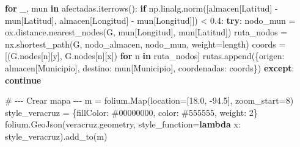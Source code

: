 \documentclass[
  spanish,
  us-letterpaper,
]{scrreprt}
\newenvironment{Shaded}{\begin{snugshade}}{\end{snugshade}}
\newcommand{\CommentTok}[1]{\textcolor[rgb]{0.37,0.37,0.37}{#1}}
\newcommand{\ControlFlowTok}[1]{\textcolor[rgb]{0.00,0.23,0.31}{\textbf{#1}}}
\newcommand{\DecValTok}[1]{\textcolor[rgb]{0.68,0.00,0.00}{#1}}
\newcommand{\FloatTok}[1]{\textcolor[rgb]{0.68,0.00,0.00}{#1}}
\newcommand{\KeywordTok}[1]{\textcolor[rgb]{0.00,0.23,0.31}{\textbf{#1}}}
\newcommand{\NormalTok}[1]{\textcolor[rgb]{0.00,0.23,0.31}{#1}}
\newcommand{\OperatorTok}[1]{\textcolor[rgb]{0.37,0.37,0.37}{#1}}
\newcommand{\StringTok}[1]{\textcolor[rgb]{0.13,0.47,0.30}{#1}}
\numberwithin{equation}{chapter} %
\begin{document}
\begin{Shaded}
\begin{Highlighting}[]
    \ControlFlowTok{for}\NormalTok{ \_, mun }\KeywordTok{in}\NormalTok{ afectadas.iterrows():}
        \ControlFlowTok{if}\NormalTok{ np.linalg.norm([almacen[}\StringTok{\textquotesingle{}Latitud\textquotesingle{}}\NormalTok{] }\OperatorTok{{-}}\NormalTok{ mun[}\StringTok{\textquotesingle{}Latitud\textquotesingle{}}\NormalTok{],}
\NormalTok{         almacen[}\StringTok{\textquotesingle{}Longitud\textquotesingle{}}\NormalTok{] }\OperatorTok{{-}}\NormalTok{ mun[}\StringTok{\textquotesingle{}Longitud\textquotesingle{}}\NormalTok{]]) }\OperatorTok{\textless{}} \FloatTok{0.4}\NormalTok{:}
            \ControlFlowTok{try}\NormalTok{:}
\NormalTok{                nodo\_mun }\OperatorTok{=}\NormalTok{ ox.distance.nearest\_nodes(G,}
\NormalTok{                 mun[}\StringTok{\textquotesingle{}Longitud\textquotesingle{}}\NormalTok{], mun[}\StringTok{\textquotesingle{}Latitud\textquotesingle{}}\NormalTok{])}
\NormalTok{                ruta\_nodos }\OperatorTok{=}\NormalTok{ nx.shortest\_path(G,}
\NormalTok{                 nodo\_almacen, nodo\_mun, weight}\OperatorTok{=}\StringTok{\textquotesingle{}length\textquotesingle{}}\NormalTok{)}
\NormalTok{                coords }\OperatorTok{=}\NormalTok{ [(G.nodes[n][}\StringTok{\textquotesingle{}y\textquotesingle{}}\NormalTok{],}
\NormalTok{                 G.nodes[n][}\StringTok{\textquotesingle{}x\textquotesingle{}}\NormalTok{]) }\ControlFlowTok{for}\NormalTok{ n }\KeywordTok{in}\NormalTok{ ruta\_nodos]}
\NormalTok{                rutas.append(\{}\StringTok{\textquotesingle{}origen\textquotesingle{}}\NormalTok{: almacen[}\StringTok{\textquotesingle{}Municipio\textquotesingle{}}\NormalTok{],}
                 \StringTok{\textquotesingle{}destino\textquotesingle{}}\NormalTok{: mun[}\StringTok{\textquotesingle{}Municipio\textquotesingle{}}\NormalTok{], }\StringTok{\textquotesingle{}coordenadas\textquotesingle{}}\NormalTok{: coords\})}
            \ControlFlowTok{except}\NormalTok{:}
                \ControlFlowTok{continue}

\CommentTok{\# {-}{-}{-} Crear mapa {-}{-}{-}}
\NormalTok{m }\OperatorTok{=}\NormalTok{ folium.Map(location}\OperatorTok{=}\NormalTok{[}\FloatTok{18.0}\NormalTok{, }\OperatorTok{{-}}\FloatTok{94.5}\NormalTok{], zoom\_start}\OperatorTok{=}\DecValTok{8}\NormalTok{)}
\NormalTok{style\_veracruz }\OperatorTok{=}\NormalTok{ \{}\StringTok{\textquotesingle{}fillColor\textquotesingle{}}\NormalTok{: }\StringTok{\textquotesingle{}\#00000000\textquotesingle{}}\NormalTok{,}
 \StringTok{\textquotesingle{}color\textquotesingle{}}\NormalTok{: }\StringTok{\textquotesingle{}\#555555\textquotesingle{}}\NormalTok{, }\StringTok{\textquotesingle{}weight\textquotesingle{}}\NormalTok{: }\DecValTok{2}\NormalTok{\}}
\NormalTok{folium.GeoJson(veracruz.geometry,}
\NormalTok{ style\_function}\OperatorTok{=}\KeywordTok{lambda}\NormalTok{ x: style\_veracruz).add\_to(m)}


\end{Highlighting}
\end{Shaded}
\end{document}
